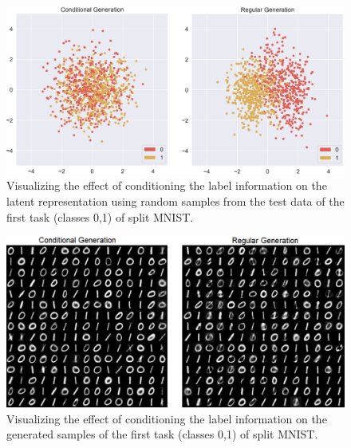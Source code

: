 \documentclass[letterpaper]{article} %
\begin{document}
\begin{figure}[ht]
\centering
\includegraphics[width=\columnwidth]{pic/conditioningvsnotconditioning.png}
\caption{Visualizing the effect of conditioning the label information on the latent representation using random samples from the test data of the first task (classes 0,1) of split MNIST.}
\label{z_with_conditioning}
\end{figure}
\begin{figure}[ht]
\centering
\includegraphics[width=\columnwidth]{pic/generation_conditional_regular.pdf}
\caption{Visualizing the effect of conditioning the label information on the generated samples of the first task (classes 0,1) of split MNIST.}
\label{samples_with_without_condition}
\end{figure}
\end{document}
